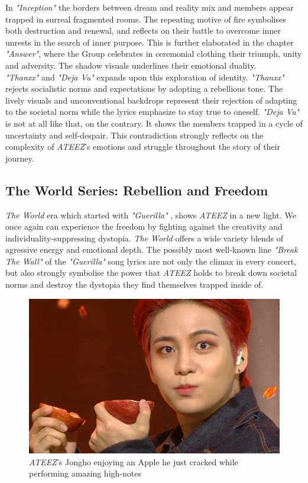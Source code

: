 \documentclass[a4paper,12pt]{article}
\begin{document}
In \textit{"Inception"} \cite{ateez_inception} the borders between dream and reality mix and members appear trapped in surreal fragmented rooms. The repeating motive of fire symbolises both destruction and renewal, and reflects on their battle to overcome inner unrests in the search of inner purpose. This is further elaborated in the chapter \textit{"Answer"}, where the Group celebrates in ceremonial clothing their triumph, unity and adversity. The shadow visuals underlines their emotional duality.\\

\textit{"Thanxx"} \cite{ateez_thanxx} and \textit{"Deja Vu"} \cite{ateez_dejavu} expands upon this exploration of identity. \textit{"Thanxx"} rejects socialistic norms and expectations by adopting a rebellious tone. The lively visuals and unconventional backdrops represent their rejection of adapting to the societal norm while the lyrics emphasize to stay true to oneself. \textit{"Deja Vu"} is not at all like that, on the contrary. It shows the members trapped in a cycle of uncertainty and self-despair. This contradiction strongly reflects on the complexity of \textit{ATEEZ}'s emotions and struggle throughout the story of their journey.

\subsection{The World Series: Rebellion and Freedom}
\textit{The World} era which started with \textit{"Guerilla"} \cite{ateez_guerilla}, shows \textit{ATEEZ} in a new light. We once again can experience the freedom by fighting against the creativity and individuality-suppressing dystopia. \textit{The World} offers a wide variety blends of agressive energy and emotional depth. The possibly most well-known line \textit{"Break The Wall"} of the \textit{"Guerilla"} song lyrics are not only the climax in every concert, but also strongly symbolise the power that \textit{ATEEZ} holds to break down societal norms and destroy the dystopia they find themselves trapped inside of.

\vspace{2cm}
\begin{figure}[H]
    \centering
    \includegraphics[width=0.5\linewidth]{images/jongho_apple.jpg}
    \caption{\textit{ATEEZ}'s Jongho enjoying an Apple he just cracked while performing amazing high-notes}
    \label{fig:enter-label}
\end{figure}
\end{document}
